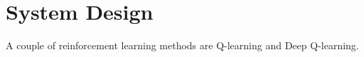 \documentclass[final]{LTHtwocol} %
\begin{document}
%
%

\section{System Design}
A couple of reinforcement learning methods are Q-learning and Deep Q-learning.
\end{document}
